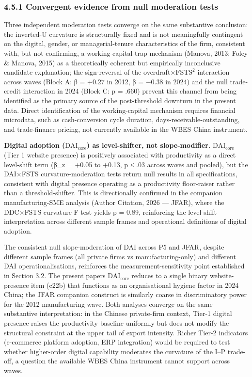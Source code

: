 \documentclass[12pt,a4paper]{article}
\begin{document}
\hypertarget{451-convergent-evidence-from-null-moderation-tests}{%
\subsubsection{4.5.1 Convergent evidence from null moderation
tests}\label{451-convergent-evidence-from-null-moderation-tests}}

Three independent moderation tests converge on the same substantive
conclusion: the inverted-U curvature is structurally fixed and is not
meaningfully contingent on the digital, gender, or managerial-tenure
characteristics of the firm, consistent with, but not confirming, a
working-capital-trap mechanism (Manova, 2013; Foley \& Manova, 2015) as
a theoretically coherent but empirically inconclusive candidate
explanation; the sign-reversal of the overdraft×\(\mathrm{FSTS}^2\)
interaction across waves (Block A: β = +0.27 in 2012, β = −0.38 in 2024)
and the null trade-credit interaction in 2024 (Block C: p = .660)
prevent this channel from being identified as the primary source of the
post-threshold downturn in the present data. Direct identification of
the working-capital mechanism requires financial microdata, such as
cash-conversion cycle duration, days-receivable-outstanding, and
trade-finance pricing, not currently available in the WBES China
instrument.

\textbf{Digital adoption (\(\mathrm{DAI}_{\text{core}}\)) as
level-shifter, not slope-modifier.} \(\mathrm{DAI}_{\text{core}}\) (Tier
1 website presence) is positively associated with productivity as a
direct level-shift term (β\_z = +0.05 to +0.13, p ≤ .03 across waves and
pooled), but the DAI×FSTS curvature-moderation tests return null results
in all specifications, consistent with digital presence operating as a
productivity floor-raiser rather than a threshold-shifter. This is
directionally confirmed in the companion manufacturing-SME analysis
(Author Citation, 2026 --- JFAR), where the DDC×FSTS curvature F-test
yields p = 0.89, reinforcing the level-shift interpretation across
different sample frames and operational definitions of digital adoption.

The consistent null slope-moderation of DAI across P5 and JFAR, despite
different sample frames (all private firms vs manufacturing-only) and
different DAI operationalisations, reinforces the
measurement-sensitivity point established in Section 3.2. The present
paper\textquotesingle s \(\mathrm{DAI}_{\text{core}}\) reduces to a
single binary website-presence item (c22b) that functions as an
organisational hygiene factor in 2024 China; the JFAR companion
construct is similarly coarse in discriminatory power for the 2012
manufacturing wave. Both analyses converge on the same substantive
interpretation: in the Chinese private-firm context, Tier-1 digital
presence raises the productivity baseline uniformly but does not modify
the structural constraint at the upper tail of export intensity. Richer
Tier-2 indicators (e-commerce platform adoption, ERP integration) would
be required to test whether higher-order digital capability moderates
the curvature of the I--P trade-off, a question the available WBES China
instrument cannot support across waves.
\end{document}
